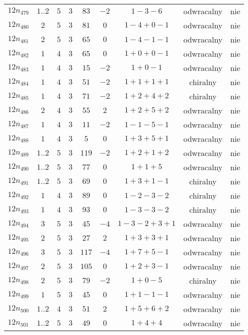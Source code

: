 \begin{longtable}{ccccccccc}
$12n_{479}$ & $1..2$ & $5$ & $3$ & $83$ & $-2$ & $1-3-6$ & odwracalny & nie \\
$12n_{480}$ & $2$ & $5$ & $3$ & $81$ & $0$ & $1-4+0-1$ & odwracalny & nie \\
$12n_{481}$ & $2$ & $5$ & $3$ & $65$ & $0$ & $1-4-1-1$ & odwracalny & nie \\
$12n_{482}$ & $1$ & $4$ & $3$ & $65$ & $0$ & $1+0+0-1$ & odwracalny & nie \\
$12n_{483}$ & $1$ & $4$ & $3$ & $15$ & $-2$ & $1+0-1$ & odwracalny & nie \\
$12n_{484}$ & $1$ & $4$ & $3$ & $51$ & $-2$ & $1+1+1+1$ & chiralny & nie \\
$12n_{485}$ & $1$ & $4$ & $3$ & $71$ & $-2$ & $1+2+4+2$ & chiralny & nie \\
$12n_{486}$ & $2$ & $4$ & $3$ & $55$ & $2$ & $1+2+5+2$ & odwracalny & nie \\
$12n_{487}$ & $1$ & $4$ & $3$ & $11$ & $-2$ & $1-1-5-1$ & odwracalny & nie \\
$12n_{488}$ & $1$ & $4$ & $3$ & $5$ & $0$ & $1+3+5+1$ & odwracalny & nie \\
$12n_{489}$ & $1..2$ & $5$ & $3$ & $119$ & $-2$ & $1+2+1+2$ & odwracalny & nie \\
$12n_{490}$ & $1..2$ & $5$ & $3$ & $77$ & $0$ & $1+1+5$ & odwracalny & nie \\
$12n_{491}$ & $1..2$ & $5$ & $3$ & $69$ & $0$ & $1+3+1-1$ & chiralny & nie \\
$12n_{492}$ & $1$ & $4$ & $3$ & $89$ & $0$ & $1-2-3-2$ & chiralny & nie \\
$12n_{493}$ & $1$ & $4$ & $3$ & $93$ & $0$ & $1-3-3-2$ & chiralny & nie \\
$12n_{494}$ & $3$ & $5$ & $3$ & $45$ & $-4$ & $1-3-2+3+1$ & odwracalny & nie \\
$12n_{495}$ & $2$ & $5$ & $3$ & $27$ & $2$ & $1+3+3+1$ & odwracalny & nie \\
$12n_{496}$ & $3$ & $5$ & $3$ & $117$ & $-4$ & $1+7+5-1$ & odwracalny & nie \\
$12n_{497}$ & $2$ & $5$ & $3$ & $105$ & $0$ & $1+2+3-1$ & odwracalny & nie \\
$12n_{498}$ & $2$ & $5$ & $3$ & $79$ & $-2$ & $1+0-5$ & chiralny & nie \\
$12n_{499}$ & $1$ & $5$ & $3$ & $45$ & $0$ & $1+1-1-1$ & odwracalny & nie \\
$12n_{500}$ & $1..2$ & $4$ & $3$ & $51$ & $2$ & $1+5+6+2$ & odwracalny & nie \\
$12n_{501}$ & $1..2$ & $5$ & $3$ & $49$ & $0$ & $1+4+4$ & odwracalny & nie \\

\end{longtable}
